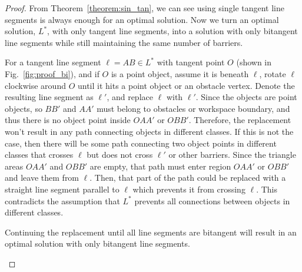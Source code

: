 \begin{proof}
From Theorem~\ref{theorem:sin_tan}, we can see using single tangent line segments is always enough
for an optimal solution. 
Now we turn an optimal solution, $L^*$, with only tangent line segments, into
a solution with only bitangent line segments while still maintaining the same number of barriers. 

For a tangent line segment $\ell=AB\in L^*$ with tangent point $O$ (shown in Fig.~\ref{fig:proof_bi}), and if $O$ is a point object, assume it is beneath $\ell$,
rotate $\ell$ clockwise around $O$ until it hits a point object or an obstacle vertex.
Denote the resulting line segment as $\ell'$, and replace $\ell$ with $\ell'$.
Since the objects are point objects, so $BB'$ and $AA'$ must belong to obstacles or workspace boundary, 
and thus there is no object point inside $OAA'$ or $OBB'$. 
Therefore, the replacement won't result in
any path connecting objects in different classes.
If this is not the case, then there will be some path connecting two object points in different classes that crosses $\ell$ but does not cross $\ell'$ or other barriers. 
Since the triangle areas $OAA'$ and $OBB'$ are empty, that path must enter region $OAA'$ or $OBB'$ and leave them from $\ell$. Then, that part of the path could be replaced with a straight line segment parallel to $\ell$ which prevents it from crossing $\ell$. This contradicts the assumption that $L^*$ prevents all connections between objects in different classes. %

Continuing the replacement until all line segments are bitangent will result in an optimal solution with only bitangent line segments.

\begin{figure}[ht]
    \centering
{}
\end{figure}
\end{proof}
